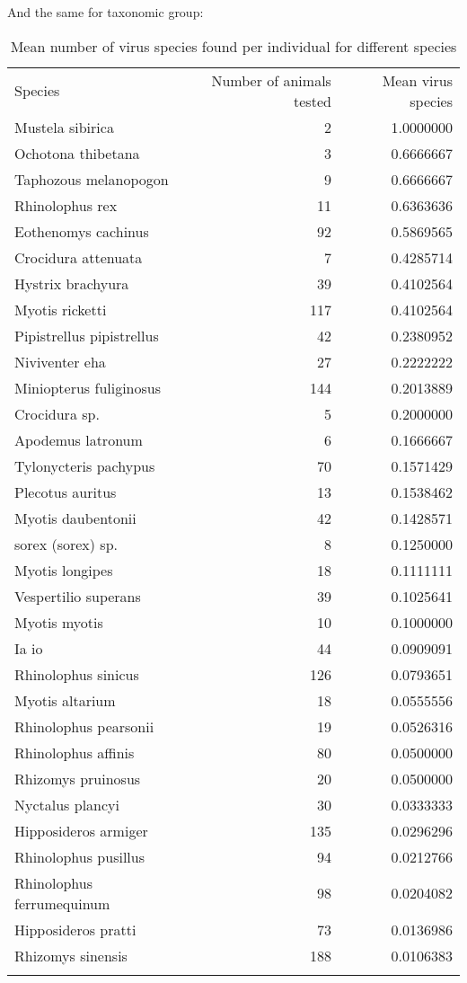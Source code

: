 \documentclass[11pt,article,oneside]{article}
\begin{document}
And the same for taxonomic group:

\begin{longtable}[c]{@{}lrr@{}}
\toprule\addlinespace
Species & Number of animals tested & Mean virus species
\\\addlinespace
\midrule\endhead
Mustela sibirica & 2 & 1.0000000
\\\addlinespace
Ochotona thibetana & 3 & 0.6666667
\\\addlinespace
Taphozous melanopogon & 9 & 0.6666667
\\\addlinespace
Rhinolophus rex & 11 & 0.6363636
\\\addlinespace
Eothenomys cachinus & 92 & 0.5869565
\\\addlinespace
Crocidura attenuata & 7 & 0.4285714
\\\addlinespace
Hystrix brachyura & 39 & 0.4102564
\\\addlinespace
Myotis ricketti & 117 & 0.4102564
\\\addlinespace
Pipistrellus pipistrellus & 42 & 0.2380952
\\\addlinespace
Niviventer eha & 27 & 0.2222222
\\\addlinespace
Miniopterus fuliginosus & 144 & 0.2013889
\\\addlinespace
Crocidura sp. & 5 & 0.2000000
\\\addlinespace
Apodemus latronum & 6 & 0.1666667
\\\addlinespace
Tylonycteris pachypus & 70 & 0.1571429
\\\addlinespace
Plecotus auritus & 13 & 0.1538462
\\\addlinespace
Myotis daubentonii & 42 & 0.1428571
\\\addlinespace
sorex (sorex) sp. & 8 & 0.1250000
\\\addlinespace
Myotis longipes & 18 & 0.1111111
\\\addlinespace
Vespertilio superans & 39 & 0.1025641
\\\addlinespace
Myotis myotis & 10 & 0.1000000
\\\addlinespace
Ia io & 44 & 0.0909091
\\\addlinespace
Rhinolophus sinicus & 126 & 0.0793651
\\\addlinespace
Myotis altarium & 18 & 0.0555556
\\\addlinespace
Rhinolophus pearsonii & 19 & 0.0526316
\\\addlinespace
Rhinolophus affinis & 80 & 0.0500000
\\\addlinespace
Rhizomys pruinosus & 20 & 0.0500000
\\\addlinespace
Nyctalus plancyi & 30 & 0.0333333
\\\addlinespace
Hipposideros armiger & 135 & 0.0296296
\\\addlinespace
Rhinolophus pusillus & 94 & 0.0212766
\\\addlinespace
Rhinolophus ferrumequinum & 98 & 0.0204082
\\\addlinespace
Hipposideros pratti & 73 & 0.0136986
\\\addlinespace
Rhizomys sinensis & 188 & 0.0106383
\\\addlinespace
\bottomrule
\addlinespace
\caption{Mean number of virus species found per individual for different
species}
\end{longtable}
\end{document}
